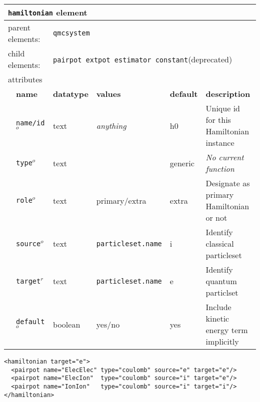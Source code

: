 \FloatBarrier
\begin{table}[h]
\begin{center}
\begin{tabularx}{\textwidth}{l l l l l l }
\hline
\multicolumn{6}{l}{\texttt{hamiltonian} element} \\
\hline
\multicolumn{2}{l}{parent elements:} & \multicolumn{4}{l}{\texttt{qmcsystem}}\\
\multicolumn{2}{l}{child  elements:} & \multicolumn{4}{l}{\texttt{pairpot extpot estimator constant}(deprecated)}\\
\multicolumn{2}{l}{attributes}  & \multicolumn{4}{l}{}\\
   &   \bfseries name     & \bfseries datatype & \bfseries values & \bfseries default   & \bfseries description \\
   &   \texttt{name/id}$^o$ &  text              & \textit{anything}& h0                  & Unique id for this Hamiltonian instance                      \\
   &   \texttt{type}$^o$    &  text              &                  & generic             & \textit{No current function}                      \\
   &   \texttt{role}$^o$    &  text              & primary/extra    & extra               & Designate as primary Hamiltonian or not                      \\
   &   \texttt{source}$^o$  &  text              & \texttt{particleset.name} & i          & Identify classical particleset                      \\
   &   \texttt{target}$^r$  &  text              & \texttt{particleset.name} & e          & Identify quantum particlset                      \\
   &   \texttt{default}$^o$ &  boolean           & yes/no           & yes                 & Include kinetic energy term implicitly                      \\
  \hline
\end{tabularx}
\end{center}
\end{table}
\FloatBarrier

\begin{lstlisting}[caption=All electron Hamiltonian XML element.]
<hamiltonian target="e">
  <pairpot name="ElecElec" type="coulomb" source="e" target="e"/>
  <pairpot name="ElecIon"  type="coulomb" source="i" target="e"/>
  <pairpot name="IonIon"   type="coulomb" source="i" target="i"/>
</hamiltonian>
\end{lstlisting}


